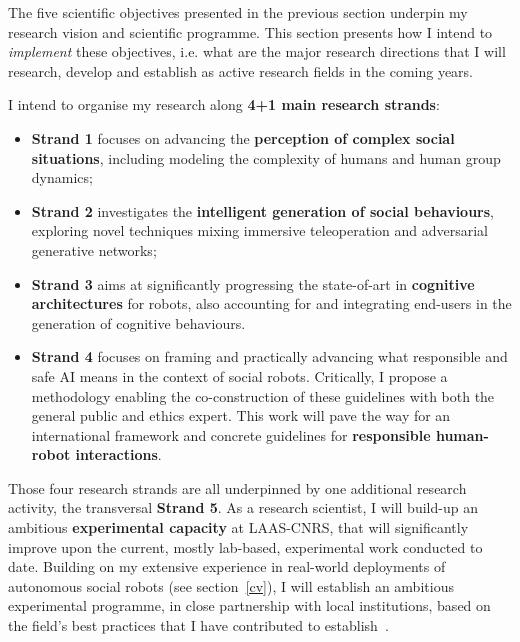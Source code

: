 The five scientific objectives presented in the previous section underpin my
research vision and scientific programme. This section presents how I intend
to \emph{implement} these objectives, i.e.  what are the major research
directions that I will research, develop and establish as active research fields
in the coming years.

\vspace{0.5em}
I intend to organise my research along \textbf{4+1 main research
strands}:

\vspace{0.5em}
\begin{itemize}
    \item {\bf Strand 1} focuses on advancing the \textbf{perception of complex social
        situations}, including modeling the complexity of humans and human group
        dynamics;
    \item {\bf Strand 2} investigates the \textbf{intelligent generation of social
        behaviours}, exploring novel techniques mixing immersive teleoperation
        and adversarial generative networks;
    \item {\bf Strand 3} aims at significantly progressing the state-of-art in
        \textbf{cognitive architectures} for robots, also accounting for and integrating
        end-users in the generation of cognitive behaviours.
    \item {\bf Strand 4} focuses on framing and practically advancing what
        responsible and safe AI means in the context of social robots.
        Critically, I propose a methodology enabling the co-construction of
        these guidelines with both the general public and ethics expert. This
        work will pave the way for an international framework and concrete
        guidelines for \textbf{responsible
        human-robot interactions}.
\end{itemize}
\vspace{0.5em}


Those four research strands are all underpinned by one additional research
activity, the transversal {\bf Strand 5}. As a research scientist, I will
build-up an ambitious \textbf{experimental capacity} at LAAS-CNRS, that will
significantly improve upon the current, mostly lab-based, experimental work
conducted to date. Building on my extensive experience in real-world deployments
of autonomous social robots (see section~\ref{cv}), I will establish an
ambitious experimental programme, in close partnership with local institutions,
based on the field's best practices that I have contributed to
establish~\parencite{baxter2016characterising}.


